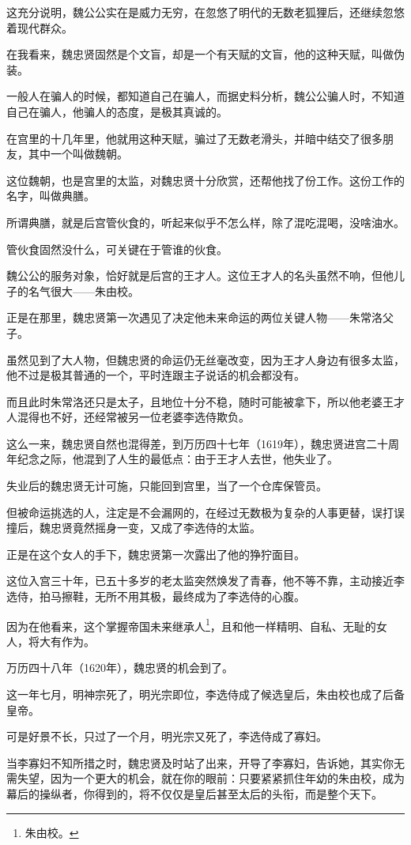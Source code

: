 \begin{multicols}{\theparacolNo}
这充分说明，魏公公实在是威力无穷，在忽悠了明代的无数老狐狸后，还继续忽悠着现代群众。

在我看来，魏忠贤固然是个文盲，却是一个有天赋的文盲，他的这种天赋，叫做伪装。

一般人在骗人的时候，都知道自己在骗人，而据史料分析，魏公公骗人时，不知道自己在骗人，他骗人的态度，是极其真诚的。

在宫里的十几年里，他就用这种天赋，骗过了无数老滑头，并暗中结交了很多朋友，其中一个叫做魏朝。

这位魏朝，也是宫里的太监，对魏忠贤十分欣赏，还帮他找了份工作。这份工作的名字，叫做典膳。

所谓典膳，就是后宫管伙食的，听起来似乎不怎么样，除了混吃混喝，没啥油水。

管伙食固然没什么，可关键在于管谁的伙食。

魏公公的服务对象，恰好就是后宫的王才人。这位王才人的名头虽然不响，但他儿子的名气很大——朱由校。

正是在那里，魏忠贤第一次遇见了决定他未来命运的两位关键人物——朱常洛父子。

虽然见到了大人物，但魏忠贤的命运仍无丝毫改变，因为王才人身边有很多太监，他不过是极其普通的一个，平时连跟主子说话的机会都没有。

而且此时朱常洛还只是太子，且地位十分不稳，随时可能被拿下，所以他老婆王才人混得也不好，还经常被另一位老婆李选侍欺负。

这么一来，魏忠贤自然也混得差，到万历四十七年（1619年），魏忠贤进宫二十周年纪念之际，他混到了人生的最低点：由于王才人去世，他失业了。

失业后的魏忠贤无计可施，只能回到宫里，当了一个仓库保管员。

但被命运挑选的人，注定是不会漏网的，在经过无数极为复杂的人事更替，误打误撞后，魏忠贤竟然摇身一变，又成了李选侍的太监。

正是在这个女人的手下，魏忠贤第一次露出了他的狰狞面目。

这位入宫三十年，已五十多岁的老太监突然焕发了青春，他不等不靠，主动接近李选侍，拍马擦鞋，无所不用其极，最终成为了李选侍的心腹。

因为在他看来，这个掌握帝国未来继承人\footnote{朱由校。}，且和他一样精明、自私、无耻的女人，将大有作为。

万历四十八年（1620年），魏忠贤的机会到了。

这一年七月，明神宗死了，明光宗即位，李选侍成了候选皇后，朱由校也成了后备皇帝。

可是好景不长，只过了一个月，明光宗又死了，李选侍成了寡妇。

当李寡妇不知所措之时，魏忠贤及时站了出来，开导了李寡妇，告诉她，其实你无需失望，因为一个更大的机会，就在你的眼前：只要紧紧抓住年幼的朱由校，成为幕后的操纵者，你得到的，将不仅仅是皇后甚至太后的头衔，而是整个天下。


\end{multicols}
